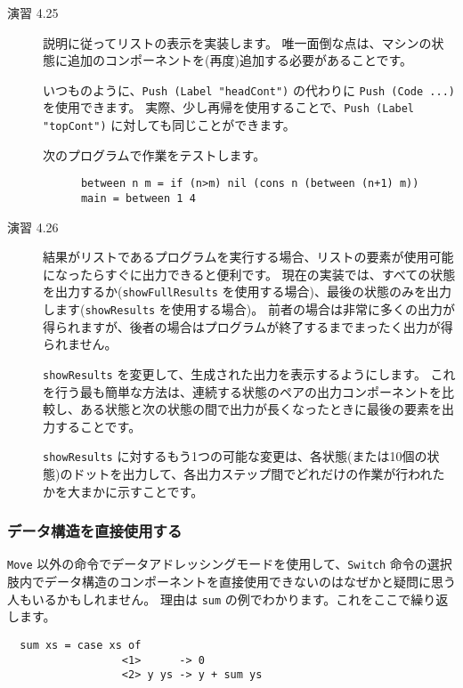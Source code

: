 \documentclass{jarticle}
\begin{document}
\begin{description}
	\item[演習 4.25] 説明に従ってリストの表示を実装します。
		唯一面倒な点は、マシンの状態に追加のコンポーネントを(再度)追加する必要があることです。

		いつものように、\texttt{Push (Label "headCont")} の代わりに \texttt{Push (Code ...)} を使用できます。
		実際、少し再帰を使用することで、\texttt{Push (Label "topCont")} に対しても同じことができます。

		次のプログラムで作業をテストします。

		\begin{verbatim}
      between n m = if (n>m) nil (cons n (between (n+1) m))
      main = between 1 4
    \end{verbatim}

	\item[演習 4.26] 結果がリストであるプログラムを実行する場合、リストの要素が使用可能になったらすぐに出力できると便利です。
		現在の実装では、すべての状態を出力するか(\texttt{showFullResults} を使用する場合)、最後の状態のみを出力します(\texttt{showResults} を使用する場合)。
		前者の場合は非常に多くの出力が得られますが、後者の場合はプログラムが終了するまでまったく出力が得られません。

		\texttt{showResults} を変更して、生成された出力を表示するようにします。
		これを行う最も簡単な方法は、連続する状態のペアの出力コンポーネントを比較し、ある状態と次の状態の間で出力が長くなったときに最後の要素を出力することです。

		\texttt{showResults} に対するもう1つの可能な変更は、各状態(または10個の状態)のドットを出力して、各出力ステップ間でどれだけの作業が行われたかを大まかに示すことです。
\end{description}

\subsubsection{データ構造を直接使用する \dag}

\texttt{Move} 以外の命令でデータアドレッシングモードを使用して、\texttt{Switch} 命令の選択肢内でデータ構造のコンポーネントを直接使用できないのはなぜかと疑問に思う人もいるかもしれません。
理由は \texttt{sum} の例でわかります。これをここで繰り返します。

\begin{verbatim}
  sum xs = case xs of
                  <1>      -> 0
                  <2> y ys -> y + sum ys
\end{verbatim}
\end{document}
